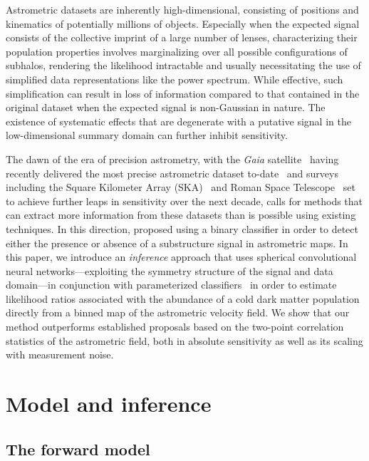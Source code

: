 \documentclass[twocolumn,linenumbers]{aastex631}
\begin{document}
Astrometric datasets are inherently high-dimensional, consisting of positions and kinematics of potentially millions of objects. Especially when the expected signal consists of the collective imprint of a large number of lenses, characterizing their population properties involves marginalizing over all possible configurations of subhalos, rendering the likelihood intractable and usually necessitating the use of simplified data representations like the power spectrum. While effective, such simplification can result in loss of information compared to that contained in the original dataset when the expected signal is non-Gaussian in nature. The existence of systematic effects that are degenerate with a putative signal in the low-dimensional summary domain can further inhibit sensitivity. 

The dawn of the era of precision astrometry, with the \emph{Gaia} satellite~\citep{2016A&A...595A...1G} having recently delivered the most precise astrometric dataset to-date~\citep{2018A&A...616A...1G,2018A&A...616A...2L,2021A&A...649A...1G} and surveys including the Square Kilometer Array (SKA)~\citep{Fomalont:2004hr,Jarvis:2015tqa} and Roman Space Telescope~\citep{2019JATIS...5d4005W} set to achieve further leaps in sensitivity over the next decade, calls for methods that can extract more information from these datasets than is possible using existing techniques. In this direction, \citet{Vattis:2020kaa} proposed using a binary classifier in order to detect either the presence or absence of a substructure signal in astrometric maps. In this paper, we introduce an \emph{inference} approach that uses spherical convolutional neural networks---exploiting the symmetry structure of the signal and data domain---in conjunction with parameterized classifiers~\citep{Cranmer:2015bka,Baldi:2016fzo} in order to estimate likelihood ratios associated with the abundance of a cold dark matter population directly from a binned map of the astrometric velocity field. 
We show that our method outperforms established proposals based on the two-point correlation statistics of the astrometric field, both in absolute sensitivity as well as its scaling with measurement noise.

\section{Model and inference}
\label{sec:model}

\subsection{The forward model}
\end{document}
